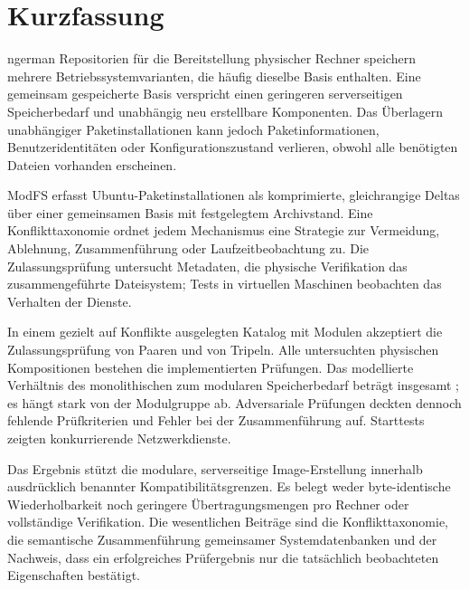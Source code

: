 \chapter*{Kurzfassung}
\begin{otherlanguage*}{ngerman}
Repositorien für die Bereitstellung physischer Rechner speichern mehrere Betriebssystemvarianten, die häufig dieselbe Basis enthalten. Eine gemeinsam gespeicherte Basis verspricht einen geringeren serverseitigen Speicherbedarf und unabhängig neu erstellbare Komponenten. Das Überlagern unabhängiger Paketinstallationen kann jedoch Paketinformationen, Benutzeridentitäten oder Konfigurationszustand verlieren, obwohl alle benötigten Dateien vorhanden erscheinen.

ModFS erfasst Ubuntu-Paketinstallationen als komprimierte, gleichrangige Deltas über einer gemeinsamen Basis mit festgelegtem Archivstand. Eine Konflikttaxonomie ordnet jedem Mechanismus eine Strategie zur Vermeidung, Ablehnung, Zusammenführung oder Laufzeitbeobachtung zu. Die Zulassungsprüfung untersucht Metadaten, die physische Verifikation das zusammengeführte Dateisystem; Tests in virtuellen Maschinen beobachten das Verhalten der Dienste.

In einem gezielt auf Konflikte ausgelegten Katalog mit  Modulen akzeptiert die Zulassungsprüfung  von  Paaren und  von  Tripeln. Alle  untersuchten physischen Kompositionen bestehen die implementierten Prüfungen. Das modellierte Verhältnis des monolithischen zum modularen Speicherbedarf beträgt insgesamt ; es hängt stark von der Modulgruppe ab. Adversariale Prüfungen deckten dennoch fehlende Prüfkriterien und Fehler bei der Zusammenführung auf. Starttests zeigten konkurrierende Netzwerkdienste.

Das Ergebnis stützt die modulare, serverseitige Image-Erstellung innerhalb ausdrücklich benannter Kompatibilitätsgrenzen. Es belegt weder byte-identische Wiederholbarkeit noch geringere Übertragungsmengen pro Rechner oder vollständige Verifikation. Die wesentlichen Beiträge sind die Konflikttaxonomie, die semantische Zusammenführung gemeinsamer Systemdatenbanken und der Nachweis, dass ein erfolgreiches Prüfergebnis nur die tatsächlich beobachteten Eigenschaften bestätigt.
\end{otherlanguage*}
